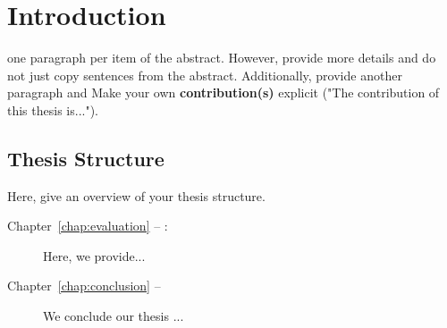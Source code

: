 
\chapter{Introduction}
\label{chap:introduction}
one paragraph per item of the abstract. However, provide more details and do not just copy sentences from the abstract. 
Additionally, provide  another paragraph and  Make your own \textbf{contribution(s)} explicit ("The contribution of this thesis is...").


\section*{Thesis Structure}
Here, give an overview of your thesis structure.
\begin{description}
\item[Chapter~\ref{chap:evaluation} -- :] Here, we provide...
\item[Chapter~\ref{chap:conclusion} -- ] We conclude our thesis ...
\end{description}
